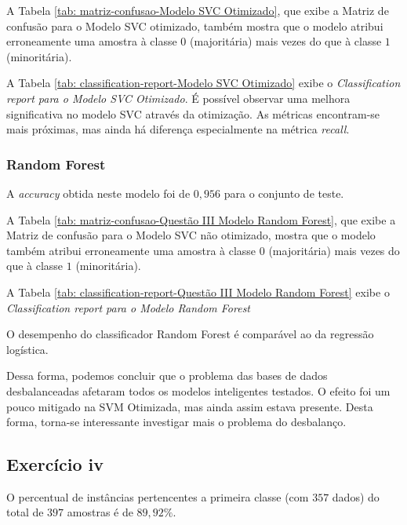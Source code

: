 A Tabela \ref{tab: matriz-confusao-Modelo SVC Otimizado}, que exibe a Matriz de confusão para o Modelo SVC otimizado, também mostra que o modelo atribui erroneamente uma amostra à classe $0$ (majoritária) mais vezes do que à classe $1$ (minoritária).



A Tabela \ref{tab: classification-report-Modelo SVC Otimizado} exibe o \textit{Classification report para o Modelo SVC Otimizado}. É possível observar uma melhora significativa no modelo SVC através da otimização. As métricas encontram-se mais próximas, mas ainda há diferença especialmente na métrica \textit{recall}.



\subsubsection{Random Forest}

A \textit{accuracy} obtida neste modelo foi de $0,956$ para o conjunto de teste.

A Tabela \ref{tab: matriz-confusao-Questão III Modelo Random Forest}, que exibe a Matriz de confusão para o Modelo SVC não otimizado, mostra que o modelo também atribui erroneamente uma amostra à classe $0$ (majoritária) mais vezes do que à classe $1$ (minoritária).



A Tabela \ref{tab: classification-report-Questão III  Modelo Random Forest} exibe o \textit{Classification report para o Modelo Random Forest}



O desempenho do classificador Random Forest é comparável ao da regressão logística.

Dessa forma, podemos concluir que o problema das bases de dados desbalanceadas afetaram todos os modelos inteligentes testados. O efeito foi um pouco mitigado na SVM Otimizada, mas ainda assim estava presente. Desta forma, torna-se interessante investigar mais o problema do desbalanço.


\subsection{Exercício iv}

O percentual de instâncias pertencentes a primeira classe (com $357$ dados) do total de $397$ amostras é de $89,92\%$.

